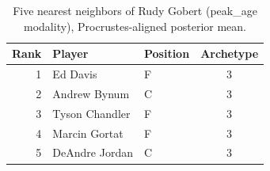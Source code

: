\begin{table}[htbp]
  \centering\small
  \begin{tabular}{rllc}
    \toprule
    Rank & Player & Position & Archetype \\
    \midrule
    1 & Ed Davis & F & 3 \\
    2 & Andrew Bynum & C & 3 \\
    3 & Tyson Chandler & F & 3 \\
    4 & Marcin Gortat & F & 3 \\
    5 & DeAndre Jordan & C & 3 \\
    \bottomrule
  \end{tabular}
  \caption{Five nearest neighbors of Rudy Gobert (peak_age modality), Procrustes-aligned posterior mean.}
  \label{tab:Rudy_Gobert_neighbors_peak_age}
\end{table}

